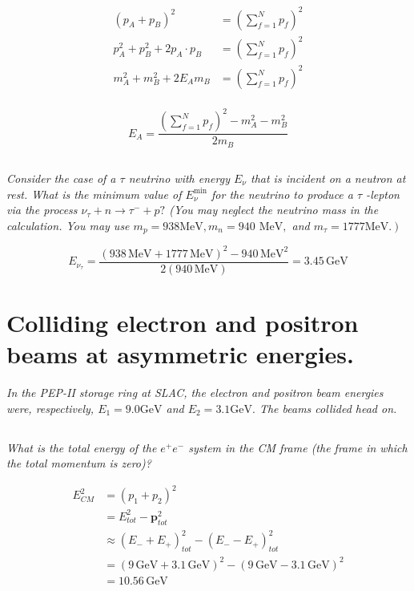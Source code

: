 \documentclass{article}
\begin{document}
\begin{align*}
    \left(p_{A}+p_{B}\right)^{2}&=\left(\sum_{f=1}^{N} p_{f}\right)^{2}\\
    p_{A}^{2}+p_{B}^{2}+2 p_{A} \cdot p_{B}&=\left(\sum_{f=1}^{N} p_{f}\right)^{2}\\
    m_{A}^{2}+m_{B}^{2}+2 E_{A} m_{B}&=\left(\sum_{f=1}^{N} p_{f}\right)^{2}\\
\end{align*}

\begin{equation*}
\boxed{
    E_{A}=\frac{\left(\sum_{f=1}^{N} p_{f}\right)^{2}-m_{A}^{2}-m_{B}^{2}}{2 m_{B}}
    }
\end{equation*}


\subsection{}
\textit{Consider the case of a $\tau$ neutrino with energy $E_{\nu}$ that is incident on a neutron at rest. What is the minimum value of $E_{\nu}^{\min }$ for the neutrino to produce a $\tau$ -lepton via the process $\nu_{\tau}+n \rightarrow \tau^{-}+p ?$ (You may neglect the neutrino mass in the calculation. You may use $m_{p}=938 \mathrm{MeV}, m_{n}=940$ $\mathrm{MeV},$ and $\left.m_{\tau}=1777 \mathrm{MeV} .\right)$}

$$
E_{\nu_{\tau}}=\frac{\left(938\, \mathrm{MeV}+1777 \,\mathrm{MeV}\right)^{2}-940 \,\mathrm{MeV}^{2}}{2(940\, \mathrm{MeV})} = 3.45  \,\mathrm{GeV}
$$


\newpage


\section{Colliding electron and positron beams at asymmetric energies.}
\textit{In the PEP-II storage ring at SLAC, the electron and positron beam energies were, respectively, $E_{1}=9.0 \mathrm{GeV}$ and $E_{2}=3.1 \mathrm{GeV} .$ The beams collided head on.}
\subsection{}
\textit{What is the total energy of the $e^{+} e^{-}$ system in the CM frame (the frame in which the total momentum is zero)?}

\begin{align*}
    E_{CM}^{2}&=\left(p_{1}+p_{2}\right)^{2}\\
    &= E_{tot}^{2} - \mathbf{p}_{tot}^2\\
    &\approx  (E_- + E_+)_{tot}^{2} - (E_- - E_+)_{tot}^2\\
    &=  (9\, \mathrm{GeV} + 3.1\, \mathrm{GeV})^{2} - (9\, \mathrm{GeV} - 3.1\, \mathrm{GeV})^2\\
    &= 10.56 \, \mathrm{GeV} \\
\end{align*}
\end{document}
